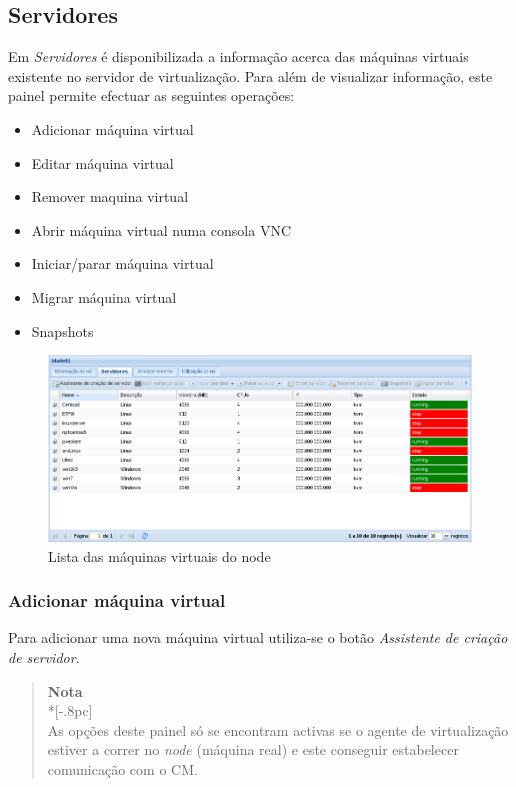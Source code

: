 \subsection{Servidores}
\label{sec:servers}
Em \emph{Servidores} é disponibilizada a informação acerca das máquinas virtuais existente no servidor de virtualização. Para além de visualizar informação, este painel permite efectuar as seguintes operações:
\begin{itemize}
	\item Adicionar máquina virtual
    \item Editar máquina virtual
	\item Remover maquina virtual
	\item Abrir máquina virtual numa consola VNC
	\item Iniciar/parar máquina virtual
    \item Migrar máquina virtual
    \item Snapshots
\end{itemize}
\begin{figure}[H]
	\begin{center}
	\includegraphics[scale=0.45]{screenshots/node_servers.png}
	\caption{Lista das máquinas virtuais do node}
	\label{fig:node_servers}
	\end{center}
\end{figure}

\subsubsection{Adicionar máquina virtual}
\label{sec:add_server}

Para adicionar uma nova máquina virtual utiliza-se o botão \emph{Assistente de criação de servidor}.
\begin{quote}
	{\large \bf Nota} \\*[-.8pc]
	\underline{\hspace{6in}} \\
	As opções deste painel só se encontram activas se o agente de virtualização estiver a correr no \emph{node} (máquina real) e este conseguir estabelecer comunicação com o CM.
\end{quote}
 

